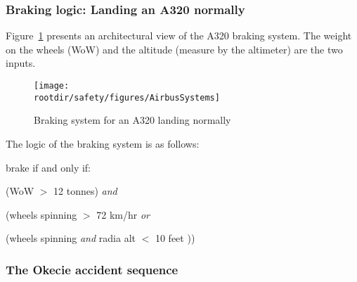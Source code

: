   \subsubsection*{Braking logic: Landing an A320 normally}

 Figure~\ref{fig:safety:AirbusSystems} presents an architectural view of the A320 braking system. The weight on the wheels (WoW) and the altitude (measure by the altimeter) are the two inputs.

  \begin{figure}[!h]
    \centering
    \texttt{[image: \\rootdir/safety/figures/AirbusSystems]}
    \caption{Braking system for an A320 landing normally}
    \label{fig:safety:AirbusSystems}
  \end{figure}

The logic of the braking system is as follows:


   \hspace{2em}   brake if and only if:

   \hspace{6em}    (WoW $>$ 12 tonnes) \emph{and}

   \hspace{6em}   (wheels spinning $>$ 72 km/hr \emph{or}

\vspace{-2mm}

   \hspace{8em} (wheels spinning \emph{and} radia alt $<$ 10 feet ))







  \subsubsection*{The Okecie accident sequence}



